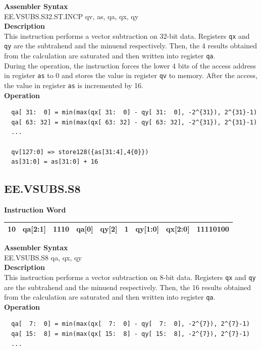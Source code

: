 \textbf{Assembler Syntax} \\
EE.VSUBS.S32.ST.INCP qv, as, qa, qx, qy \\
\textbf{Description} \\
This instruction performs a vector subtraction on 32-bit data. Registers \lstinline{qx} and \lstinline{qy} are the subtrahend and the minuend respectively. Then, the 4 results obtained from the calculation are saturated and then written into register \lstinline{qa}. \\ During the operation, the instruction forces the lower 4 bits of the access address in register \lstinline{as} to 0 and stores the value in register \lstinline{qv} to memory. After the access, the value in register \lstinline{as} is incremented by 16.\\
\textbf{Operation}
\begin{lstlisting}
  qa[ 31:  0] = min(max(qx[ 31:  0] - qy[ 31:  0], -2^{31}), 2^{31}-1)
  qa[ 63: 32] = min(max(qx[ 63: 32] - qy[ 63: 32], -2^{31}), 2^{31}-1)
  ...

  qv[127:0] => store128({as[31:4],4{0}})
  as[31:0] = as[31:0] + 16
\end{lstlisting}

\clearpage
\subsection{EE.VSUBS.S8}\label{instruction:EEVSUBSS8}
\setlength\tabcolsep{6pt}
\textbf{Instruction Word} \\
\begin{tabular}{|c|c|c|c|c|c|c|c|c|}
	\hline
	10 & qa[2:1] & 1110 & qa[0] & qy[2] & 1 & qy[1:0] & qx[2:0] & 11110100 \\
	\hline
\end{tabular}

\textbf{Assembler Syntax} \\
EE.VSUBS.S8 qa, qx, qy \\
\textbf{Description} \\
This instruction performs a vector subtraction on 8-bit data. Registers \lstinline{qx} and \lstinline{qy} are the subtrahend and the minuend respectively. Then, the 16 results obtained from the calculation are saturated and then written into register \lstinline{qa}.\\
\textbf{Operation}
\begin{lstlisting}
  qa[  7:  0] = min(max(qx[  7:  0] - qy[  7:  0], -2^{7}), 2^{7}-1)
  qa[ 15:  8] = min(max(qx[ 15:  8] - qy[ 15:  8], -2^{7}), 2^{7}-1)
  ...
\end{lstlisting}

